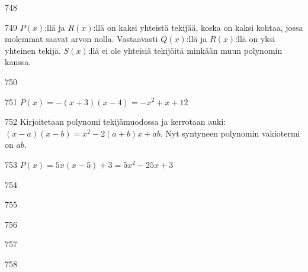 \begin{Vastaus}{748}
\end{Vastaus}
\begin{Vastaus}{749}
	$P(x)$:llä ja $R(x)$:llä on kaksi yhteistä tekijää, koska on kaksi kohtaa, jossa molemmat saavat arvon nolla. Vastaavasti $Q(x)$:llä ja $R(x)$:llä on yksi yhteinen tekijä. $S(x)$:llä ei ole yhteisiä tekijöitä minkään muun polynomin kanssa.
    
\end{Vastaus}
\begin{Vastaus}{750}
    
\end{Vastaus}
\begin{Vastaus}{751}
        $P(x)=-(x+3)(x-4)=-x^2+x+12$
    
\end{Vastaus}
\begin{Vastaus}{752}
        Kirjoitetaan polynomi tekijämuodossa ja kerrotaan auki: $(x-a)(x-b)=x^2-2(a+b)x+ab$. Nyt syntyneen polynomin vakiotermi on $ab$.
    
\end{Vastaus}
\begin{Vastaus}{753}
        $P(x)=5x(x-5)+3=5x^2-25x+3$
    
\end{Vastaus}
\begin{Vastaus}{754}
        \alakohdat{
            § $x=\frac14$ ja $y=5\frac58$.
            § $x=-\frac{b}{2a}$ %
        }
    
\end{Vastaus}
\begin{Vastaus}{755}
    
\end{Vastaus}
\begin{Vastaus}{756}
	
\end{Vastaus}
\begin{Vastaus}{757}
\end{Vastaus}
\begin{Vastaus}{758}
    
\end{Vastaus}
